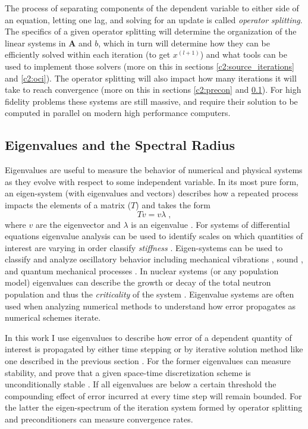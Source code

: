 The process of separating components of the dependent variable to either side of an equation, letting one lag, and solving for an update is called \emph{operator splitting}.
The specifics of a given operator splitting will determine the organization of the linear systems in $\bm{A}$ and $b$, which in turn will determine how they can be efficiently solved within each iteration (to get $x^{(l+1)}$) and what tools can be used to implement those solvers (more on this in sections \ref{c2:source_iterations} and \ref{c2:oci}).
The operator splitting will also impact how many iterations it will take to reach convergence (more on this in sections \ref{c2:precon} and \ref{c2:specrad}).
For high fidelity problems these systems are still massive, and require their solution to be computed in parallel on modern high performance computers.


\subsection{Eigenvalues and the Spectral Radius}
\label{c2:specrad}

Eigenvalues are useful to measure the behavior of numerical and physical systems as they evolve with respect to some independent variable.
In its most pure form, an eigen-system (with eigenvalues and vectors) describes how a repeated process impacts the elements of a matrix ($T$) and takes the form
\begin{equation}
    {T}v = v\lambda \;,
\end{equation}
where $v$ are the eigenvector and $\lambda$ is an eigenvalue \cite{isaacson_numerical_1966, golub_matrix_1983}.
For systems of differential equations eigenvalue analysis can be used to identify scales on which quantities of interest are varying in order classify \emph{stiffness} \cite{niemeyer_phd, walker_phd}.
Eigen-systems can be used to classify and analyze oscillatory behavior including mechanical vibrations \cite{liang_vibrations}, sound \cite{howle_2001_eigenvalues}, and quantum mechanical processes \cite{maggie_phd, krane_2019_modern}.
In nuclear systems (or any population model) eigenvalues can describe the growth or decay of the total neutron population and thus the \emph{criticality} of the system \cite{duderstadt_hamilton, trahan_phd}.
Eigenvalue systems are often used when analyzing numerical methods to understand how error propagates as numerical schemes iterate.

In this work I use eigenvalues to describe how error of a dependent quantity of interest is propagated by either time stepping \cite{ilham_phd} or by iterative solution method like one described in the previous section \cite{southworth_phd}.
For the former eigenvalues can measure stability, and prove that a given space-time discretization scheme is {unconditionally stable} \cite{Lax_1956_stability}.
If all eigenvalues are below a certain threshold the compounding effect of error incurred at every time step will remain bounded.
For the latter the eigen-spectrum of the iteration system formed by operator splitting and preconditioners can measure convergence rates.


